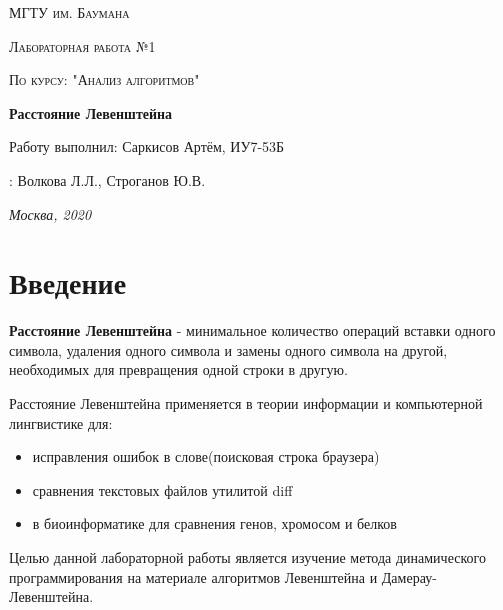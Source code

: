 \documentclass[12pt]{report}
\begin{document}
\begin{titlepage}
	\centering
	{\scshape\LARGE МГТУ им. Баумана \par}
	\vspace{3cm}
	{\scshape\Large Лабораторная работа №1\par}
	\vspace{0.5cm}	
	{\scshape\Large По курсу: "Анализ алгоритмов"\par}
	\vspace{1.5cm}
	{\huge\bfseries Расстояние Левенштейна\par}
	\vspace{2cm}
	\Large Работу выполнил: Саркисов Артём, ИУ7-53Б\par
	\vspace{0.5cm}
	:  Волкова Л.Л., Строганов Ю.В.\par

	\vfill
	\large \textit {Москва, 2020} \par
\end{titlepage}

\tableofcontents

\newpage
\chapter*{Введение}
\textbf{Расстояние Левенштейна} - минимальное количество операций вставки одного символа, удаления одного символа и замены одного символа на другой, необходимых для превращения одной строки в другую.

Расстояние Левенштейна применяется в теории информации и компьютерной лингвистике для:

\begin{itemize}
	\item исправления ошибок в слове(поисковая строка браузера)
	\item сравнения текстовых файлов утилитой diff
	\item в биоинформатике для сравнения генов, хромосом и белков
\end{itemize}

Целью данной лабораторной работы является изучение метода динамического программирования на материале алгоритмов
Левенштейна и Дамерау-Левенштейна. 
\end{document}
